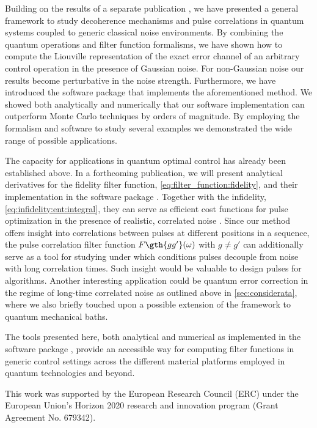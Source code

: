 Building on the results of a separate publication \cite{Cerfontaine2021}, we have presented a general framework to study decoherence mechanisms and pulse correlations in quantum systems coupled to generic classical noise environments. By combining the quantum operations and filter function formalisms, we have shown how to compute the Liouville representation of the exact error channel of an arbitrary control operation in the presence of Gaussian noise. For non-Gaussian noise our results become perturbative in the noise strength. Furthermore, we have introduced the \filterfunctions \python software package that implements the aforementioned method. We showed both analytically and numerically that our software implementation can outperform Monte Carlo techniques by orders of magnitude. By employing the formalism and software to study several examples we demonstrated the wide range of possible applications.

The capacity for applications in quantum optimal control has already been established above. In a forthcoming publication, we will present analytical derivatives for the fidelity filter function, \cref{eq:filter_function:fidelity}, and their implementation in the software package \cite{Le2021}. Together with the infidelity, \cref{eq:infidelity:ent:integral}, they can serve as efficient cost functions for pulse optimization in the presence of realistic, correlated noise \cite{qopt,Teske2021}. Since our method offers insight into correlations between pulses at different positions in a sequence, the pulse correlation filter function $F\gth{gg'}(\omega)$ with $g\neq g'$ can additionally serve as a tool for studying under which conditions pulses decouple from noise with long correlation times. Such insight would be valuable to design pulses for algorithms. Another interesting application could be quantum error correction in the regime of long-time correlated noise as outlined above in \cref{sec:considerata}, where we also briefly touched upon a possible extension of the framework to quantum mechanical baths.

The tools presented here, both analytical and numerical as implemented in the \filterfunctions software package \cite{software}, provide an accessible way for computing filter functions in generic control settings across the different material platforms employed in quantum technologies and beyond.

\begin{acknowledgments}
This work was supported by the European Research Council (ERC) under the European Union's Horizon 2020 research and innovation program (Grant Agreement No. 679342).
\end{acknowledgments}

